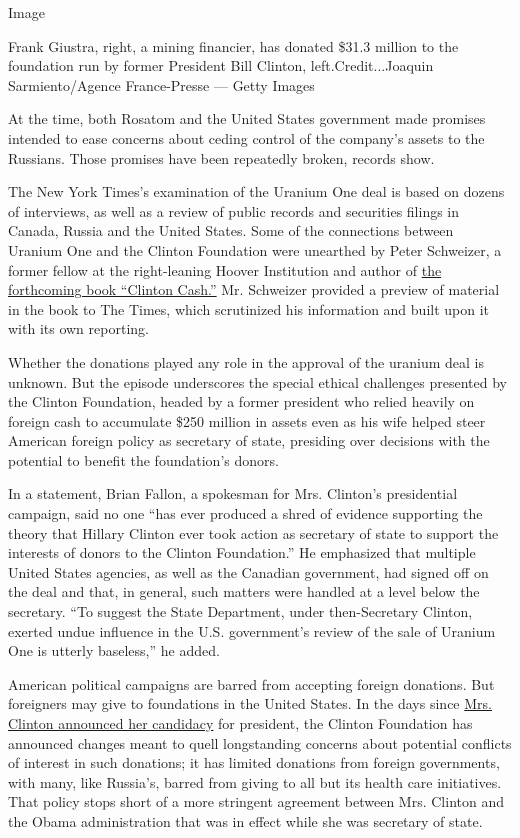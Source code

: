 Image

Frank Giustra, right, a mining financier, has donated \$31.3 million to
the foundation run by former President Bill Clinton,
left.Credit...Joaquin Sarmiento/Agence France-Presse --- Getty Images

At the time, both Rosatom and the United States government made promises
intended to ease concerns about ceding control of the company's assets
to the Russians. Those promises have been repeatedly broken, records
show.

The New York Times's examination of the Uranium One deal is based on
dozens of interviews, as well as a review of public records and
securities filings in Canada, Russia and the United States. Some of the
connections between Uranium One and the Clinton Foundation were
unearthed by Peter Schweizer, a former fellow at the right-leaning
Hoover Institution and author of
\href{http://www.nytimes.com/2015/04/20/us/politics/new-book-clinton-cash-questions-foreign-donations-to-foundation.html}{the
forthcoming book ``Clinton Cash.''} Mr. Schweizer provided a preview of
material in the book to The Times, which scrutinized his information and
built upon it with its own reporting.

Whether the donations played any role in the approval of the uranium
deal is unknown. But the episode underscores the special ethical
challenges presented by the Clinton Foundation, headed by a former
president who relied heavily on foreign cash to accumulate \$250 million
in assets even as his wife helped steer American foreign policy as
secretary of state, presiding over decisions with the potential to
benefit the foundation's donors.

In a statement, Brian Fallon, a spokesman for Mrs. Clinton's
presidential campaign, said no one ``has ever produced a shred of
evidence supporting the theory that Hillary Clinton ever took action as
secretary of state to support the interests of donors to the Clinton
Foundation.'' He emphasized that multiple United States agencies, as
well as the Canadian government, had signed off on the deal and that, in
general, such matters were handled at a level below the secretary. ``To
suggest the State Department, under then-Secretary Clinton, exerted
undue influence in the U.S. government's review of the sale of Uranium
One is utterly baseless,'' he added.

American political campaigns are barred from accepting foreign
donations. But foreigners may give to foundations in the United States.
In the days since
\href{http://www.nytimes.com/2015/04/13/us/politics/hillary-clinton-2016-presidential-campaign.html}{Mrs.
Clinton announced her candidacy} for president, the Clinton Foundation
has announced changes meant to quell longstanding concerns about
potential conflicts of interest in such donations; it has limited
donations from foreign governments, with many, like Russia's, barred
from giving to all but its health care initiatives. That policy stops
short of a more stringent agreement between Mrs. Clinton and the Obama
administration that was in effect while she was secretary of state.


